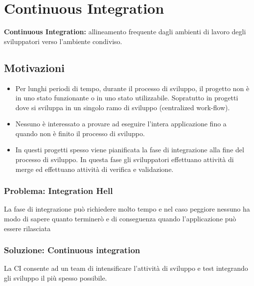 \section{Continuous Integration}
\begin{mdframed}
    \textbf{Continuous Integration:} allineamento frequente dagli ambienti di lavoro degli sviluppatori verso l'ambiente condiviso.
\end{mdframed}

\subsection{Motivazioni}
\begin{itemize}
    \item Per lunghi periodi di tempo, durante il processo di sviluppo, il progetto non è in uno stato funzionante o in uno stato utilizzabile. Sopratutto in progetti dove si sviluppa in un singolo ramo di sviluppo (centralized work-flow).
    \item Nessuno è interessato a provare ad eseguire l'intera applicazione fino a quando non è finito il processo di sviluppo.
    \item In questi progetti spesso viene pianificata la fase di integrazione alla fine del processo di sviluppo. In questa fase gli sviluppatori effettuano attività di merge ed effettuano attività di verifica e validazione.
\end{itemize}

\subsubsection{Problema: Integration Hell}
La fase di integrazione può richiedere molto tempo e nel caso peggiore nessuno ha modo di sapere quanto terminerò e di conseguenza quando l’applicazione può essere rilasciata

\subsubsection{Soluzione: Continuous integration}
La CI consente ad un team di intensificare l’attività di sviluppo e test integrando gli sviluppo il più spesso possibile.

